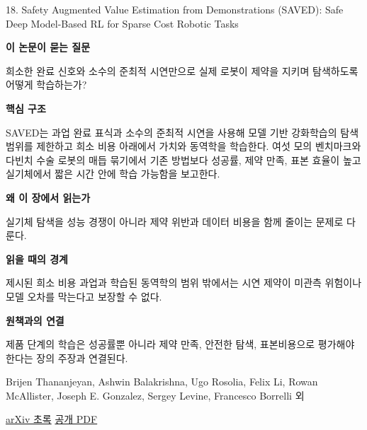 \documentclass[11pt,openany]{book}
\begin{document}
\begin{termcard}{18. Safety Augmented Value Estimation from Demonstrations (SAVED): Safe Deep Model-Based RL for Sparse Cost Robotic Tasks}

\par

\medskip

{\sffamily\bfseries\color{deepblue} 이 논문이 묻는 질문}\par

희소한 완료 신호와 소수의 준최적 시연만으로 실제 로봇이 제약을 지키며 탐색하도록 어떻게 학습하는가?

\smallskip

{\sffamily\bfseries\color{deepblue} 핵심 구조}\par

SAVED는 과업 완료 표식과 소수의 준최적 시연을 사용해 모델 기반 강화학습의 탐색 범위를 제한하고 희소 비용 아래에서 가치와 동역학을 학습한다. 여섯 모의 벤치마크와 다빈치 수술 로봇의 매듭 묶기에서 기존 방법보다 성공률, 제약 만족, 표본 효율이 높고 실기체에서 짧은 시간 안에 학습 가능함을 보고한다.

\smallskip

{\sffamily\bfseries\color{deepblue} 왜 이 장에서 읽는가}\par

실기체 탐색을 성능 경쟁이 아니라 제약 위반과 데이터 비용을 함께 줄이는 문제로 다룬다.

\smallskip

{\sffamily\bfseries\color{coral} 읽을 때의 경계}\par

제시된 희소 비용 과업과 학습된 동역학의 범위 밖에서는 시연 제약이 미관측 위험이나 모델 오차를 막는다고 보장할 수 없다.

\smallskip

{\sffamily\bfseries\color{teal} 원책과의 연결}\par

제품 단계의 학습은 성공률뿐 아니라 제약 만족, 안전한 탐색, 표본비용으로 평가해야 한다는 장의 주장과 연결된다.

\medskip

{\footnotesize\color{muted} Brijen Thananjeyan, Ashwin Balakrishna, Ugo Rosolia, Felix Li, Rowan McAllister, Joseph E. Gonzalez, Sergey Levine, Francesco Borrelli 외\par

\href{https://arxiv.org/abs/1905.13402}{arXiv 초록} \quad \href{https://arxiv.org/pdf/1905.13402}{공개 PDF}\par}

\end{termcard}
\end{document}
